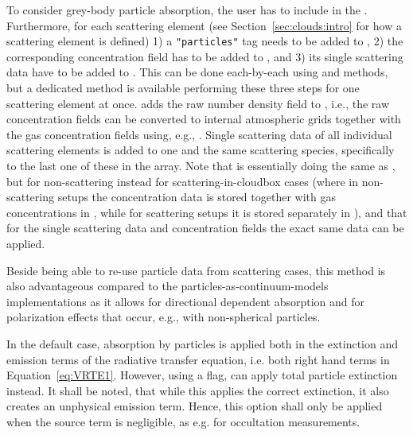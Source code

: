 To consider grey-body particle absorption, the user has to include
 in the
. Furthermore, for each scattering element
(see Section~\ref{sec:clouds:intro} for how a scattering element is defined) 1) a
\verb|"particles"| tag needs to be added to , 2) the
corresponding concentration field has to be added to ,
and 3) its single scattering data have to be added to
. This can be done each-by-each using
 and  methods, but a dedicated method
 is available performing these three
steps for one scattering element at once. 
adds the raw number density field to , i.e., the raw
concentration fields can be converted to internal atmospheric grids together
with the gas concentration fields using, e.g., .
Single scattering data of all individual scattering elements is added to one and
the same scattering species, specifically to the last one of these in the
 array.
Note that  is essentially doing the same
as , but for non-scattering instead for
scattering-in-cloudbox cases (where in non-scattering setups the concentration
data is stored together with gas concentrations in ,
while for scattering setups it is stored separately in
), and that for the single scattering data and
concentration fields the exact same data can be applied.

Beside being able to re-use particle data from scattering cases, this method is
also advantageous compared to the particles-as-continuum-models implementations
as it allows for directional dependent absorption and for polarization effects
that occur, e.g., with non-spherical particles.

In the default case, absorption by particles is applied both in the extinction
and emission terms of the radiative transfer equation, i.e. both right hand
terms in Equation~\ref{eq:VRTE1}. However, using a flag,
 can apply total particle extinction
instead. It shall be noted, that while this applies the correct extinction, it
also creates an unphysical emission term. Hence, this option shall only be
applied when the source term is negligible, as e.g. for occultation
measurements.

